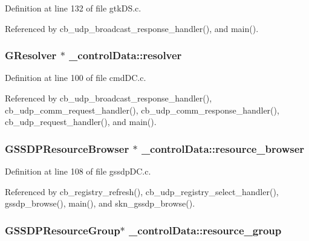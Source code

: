 Definition at line 132 of file gtk\+D\+S.\+c.



Referenced by cb\+\_\+udp\+\_\+broadcast\+\_\+response\+\_\+handler(), and main().

\subsubsection[{\texorpdfstring{resolver}{resolver}}]{\setlength{\rightskip}{0pt plus 5cm}G\+Resolver $\ast$ \+\_\+control\+Data\+::resolver}\hypertarget{struct__control_data_afe33a7083e1ecc9ba50a69644ed4a753}{}\label{struct__control_data_afe33a7083e1ecc9ba50a69644ed4a753}


Definition at line 100 of file cmd\+D\+C.\+c.



Referenced by cb\+\_\+udp\+\_\+broadcast\+\_\+response\+\_\+handler(), cb\+\_\+udp\+\_\+comm\+\_\+request\+\_\+handler(), cb\+\_\+udp\+\_\+comm\+\_\+response\+\_\+handler(), cb\+\_\+udp\+\_\+request\+\_\+handler(), and main().

\subsubsection[{\texorpdfstring{resource\+\_\+browser}{resource_browser}}]{\setlength{\rightskip}{0pt plus 5cm}G\+S\+S\+D\+P\+Resource\+Browser $\ast$ \+\_\+control\+Data\+::resource\+\_\+browser}\hypertarget{struct__control_data_a796910b4ad0830538301efd69811c2c6}{}\label{struct__control_data_a796910b4ad0830538301efd69811c2c6}


Definition at line 108 of file gssdp\+D\+C.\+c.



Referenced by cb\+\_\+registry\+\_\+refresh(), cb\+\_\+udp\+\_\+registry\+\_\+select\+\_\+handler(), gssdp\+\_\+browse(), main(), and skn\+\_\+gssdp\+\_\+browse().

\subsubsection[{\texorpdfstring{resource\+\_\+group}{resource_group}}]{\setlength{\rightskip}{0pt plus 5cm}G\+S\+S\+D\+P\+Resource\+Group$\ast$ \+\_\+control\+Data\+::resource\+\_\+group}\hypertarget{struct__control_data_ab8684a42dc1f2e00247d7278d47046b9}{}\label{struct__control_data_ab8684a42dc1f2e00247d7278d47046b9}


